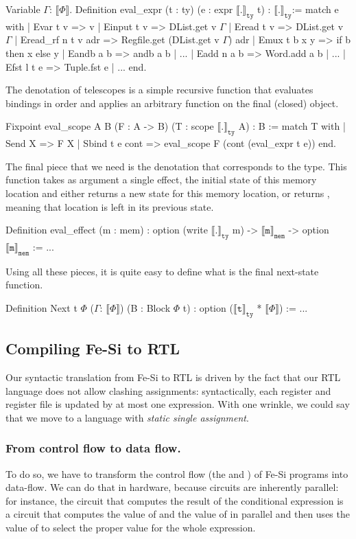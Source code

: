 \documentclass{llncs}
\newcommand{\denote}[1]{\llbracket #1 \rrbracket}
\newcommand{\denotety}[1]{\denote{\mathtt{#1}}_{\mathtt{ty}}}
\newcommand{\denotemem}[1]{\denote{\mathtt{#1}}_{\mathtt{mem}}}
\begin{document}
\begin{mcoq}
Variable $\Gamma$: $\denote{\Phi}$. 
Definition eval_expr (t : ty) (e : expr $\denotety{.}$ t) : $\denotety{.}$:=
  match e with
  | Evar t v => v
  | Einput t v => DList.get v $\Gamma$
  | Eread  t v =>  DList.get v $\Gamma$
  | Eread_rf n t v adr => Regfile.get (DList.get v $\Gamma$) adr
  | Emux t b x y => if b then x else y 
  | Eandb a b => andb a b | ...
  | Eadd n a b => Word.add a b  | ...
  | Efst l t e => Tuple.fst e | ...
  end. 
\end{mcoq}

\noindent The denotation of telescopes is a simple recursive function that
evaluates bindings in order and applies an arbitrary function on the
final (closed) object.
\begin{mcoq}
Fixpoint eval_scope {A B} (F : A -> B) (T : scope $\denotety{.}$ A) : B :=
match T with 
| Send X => F X
| Sbind t e cont => eval_scope F (cont (eval_expr t e))
end.   
\end{mcoq}
%
The final piece that we need is the denotation that corresponds to the
 type. This function takes as argument a single effect,
the initial state of this memory location  and either returns a new
state for this memory location, or returns , meaning that
location is left in its previous state.
\begin{mcoq}
Definition eval_effect (m : mem) : option (write $\denotety{.}$ m) -> $\denotemem{m}$ -> option $\denotemem{m}$ := ... 
\end{mcoq}
%
Using all these pieces, it is quite easy to define what is the final
next-state function. 
\begin{mcoq}
Definition Next {t} {$\Phi$} ($\Gamma$: $\denote{\Phi}$) (B : Block $\Phi$ t) : option ($\denotety{t}$ * $\denote{\Phi}$) := ...
\end{mcoq}

\subsection{Compiling Fe-Si to RTL} 
Our syntactic translation from Fe-Si to RTL is driven by the fact that
our RTL language does not allow clashing assignments: syntactically,
each register and register file is updated by at most one 
expression.
%
With one wrinkle, we could say that we move to a language with
\emph{static single assignment}. 

\subsubsection{From control flow to data flow.}To do so, we have to
transform the control flow (the  and ) of
Fe-Si programs into data-flow.
%
We can do that in hardware, because circuits are inherently parallel:
for instance, the circuit that computes the result of the conditional
expression \mbox{} is a circuit that computes the
value of  and the value of  in parallel and then uses
the value of  to select the proper value for the whole
expression.
\end{document}
